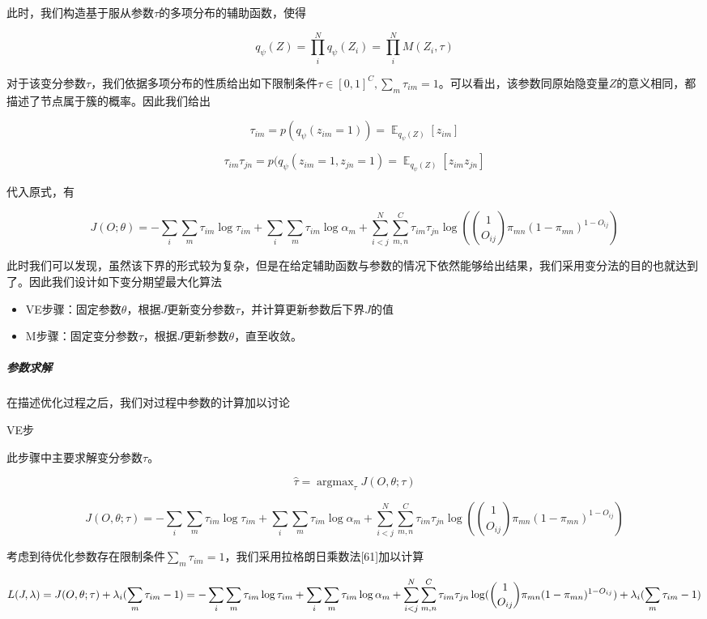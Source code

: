 \documentclass[
]{article}
\begin{document}
此时，我们构造基于服从参数\(\tau\)的多项分布的辅助函数，使得

\[q_\psi(Z)=\prod_i^N q_\psi(Z_i)=\prod_i^N M(Z_i,\tau)\]

对于该变分参数\(\tau\)，我们依据多项分布的性质给出如下限制条件\(\tau \in [0,1]^C,\sum_m \tau_{im} =1\)。可以看出，该参数同原始隐变量\(Z\)的意义相同，都描述了节点属于簇的概率。因此我们给出

\[\tau_{im}=p(q_\psi(z_{im}=1))=\mathop{\mathbb{E}}_{q_\psi(Z)}[z_{im}]\]

\[\tau_{im}\tau_{jn}=p(q_\psi(z_{im}=1,z_{jn}=1) =\mathop{\mathbb{E}}_{q_\psi(Z)}[z_{im}z_{jn}]\]

代入原式，有

\[J(O;\theta)=-\sum_i\sum_m\tau_{im} \log \tau_{im} +\sum_i\sum_m \tau_{im} \log \alpha_m +\sum_{i<j}^N\sum_{m,n}^C\tau_{im}\tau_{jn}\log ( \binom{1}{O_{ij}}\pi_{mn}(1-\pi_{mn})^{1-O_{ij}})\]

此时我们可以发现，虽然该下界的形式较为复杂，但是在给定辅助函数与参数的情况下依然能够给出结果，我们采用变分法的目的也就达到了。因此我们设计如下变分期望最大化算法

\begin{itemize}
\item
  VE步骤：固定参数\(\theta\)，根据\(J\)更新变分参数\(\tau\)，并计算更新参数后下界\(J\)的值
\item
  M步骤：固定变分参数\(\tau\)，根据\(J\)更新参数\(\theta\)，直至收敛。
\end{itemize}

\hypertarget{ux53c2ux6570ux6c42ux89e3}{%
\subparagraph{参数求解}\label{ux53c2ux6570ux6c42ux89e3}}

在描述优化过程之后，我们对过程中参数的计算加以讨论

VE步

此步骤中主要求解变分参数\(\tau\)。

\[\hat{\tau}=\mathop{\arg\max}_\tau J(O,\theta;\tau)\]

\[J(O,\theta;\tau)=-\sum_i\sum_m\tau_{im} \log \tau_{im} +\sum_i\sum_m \tau_{im} \log \alpha_m +\sum_{i<j}^N\sum_{m,n}^C\tau_{im}\tau_{jn}\log ( \binom{1}{O_{ij}}\pi_{mn}(1-\pi_{mn})^{1-O_{ij}})\]

考虑到待优化参数存在限制条件\(\sum_m \tau_{im} =1\)，我们采用拉格朗日乘数法{[}61{]}加以计算

\[L(J,\lambda)=J(O,\theta;\tau)+\lambda_i(\sum_m \tau_{im}-1)\\=-\sum_i\sum_m\tau_{im} \log \tau_{im} +\sum_i\sum_m \tau_{im} \log \alpha_m +\sum_{i<j}^N\sum_{m,n}^C\tau_{im}\tau_{jn}\log ( \binom{1}{O_{ij}}\pi_{mn}(1-\pi_{mn})^{1-O_{ij}})+\lambda_i(\sum_m \tau_{im}-1)\]
\end{document}
